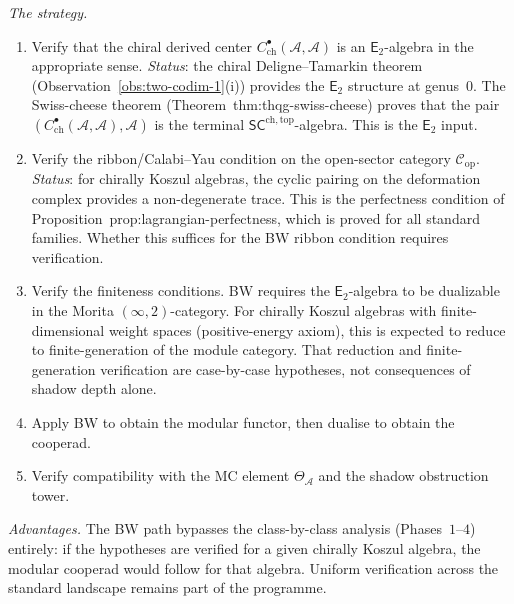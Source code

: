 \documentclass[11pt]{article}
\newcommand{\cA}{\mathcal{A}}
\newcommand{\cC}{\mathcal{C}}
\newcommand{\Etwo}{\mathsf{E}_2}
\newcommand{\SCchtop}{\mathsf{SC}^{\mathrm{ch,top}}}
\begin{document}
\noindent\emph{The strategy.}
\begin{enumerate}[label=\textup{(\roman*)},nosep]
\item Verify that the chiral derived center
  $C^\bullet_{\mathrm{ch}}(\cA, \cA)$ is an $\Etwo$-algebra
  in the appropriate sense.
  \emph{Status}: the chiral Deligne--Tamarkin theorem
  (Observation~\ref{obs:two-codim-1}(i)) provides the
  $\Etwo$ structure at genus~$0$.  The Swiss-cheese theorem
  (Theorem~\textup{thm:thqg-swiss-cheese}) proves that the
  pair $(C^\bullet_{\mathrm{ch}}(\cA,\cA), \cA)$ is the
  terminal $\SCchtop$-algebra.  This is the $\Etwo$ input.

\item Verify the ribbon/Calabi--Yau condition on the
  open-sector category $\cC_{\mathrm{op}}$.
  \emph{Status}: for chirally Koszul algebras, the cyclic
  pairing on the deformation complex provides a
  non-degenerate trace.  This is the perfectness condition
  of Proposition~\textup{prop:lagrangian-perfectness}, which
  is proved for all standard families.  Whether this suffices
  for the BW ribbon condition requires verification.

\item Verify the finiteness conditions.  BW requires the
  $\Etwo$-algebra to be dualizable in the Morita
  $(\infty,2)$-category.  For chirally Koszul algebras with
  finite-dimensional weight spaces (positive-energy axiom),
  this is expected to reduce to finite-generation of the module
  category.  That reduction and finite-generation verification are
  case-by-case hypotheses, not consequences of shadow depth alone.

\item Apply BW to obtain the modular functor, then dualise
  to obtain the cooperad.

\item Verify compatibility with the MC element $\Theta_\cA$
  and the shadow obstruction tower.
\end{enumerate}

\noindent\emph{Advantages.}
The BW path bypasses the class-by-class analysis (Phases~$1$--$4$)
entirely: if the hypotheses are verified for a given chirally
Koszul algebra, the modular cooperad would follow for that algebra.
Uniform verification across the standard landscape remains part of
the programme.
\end{document}

